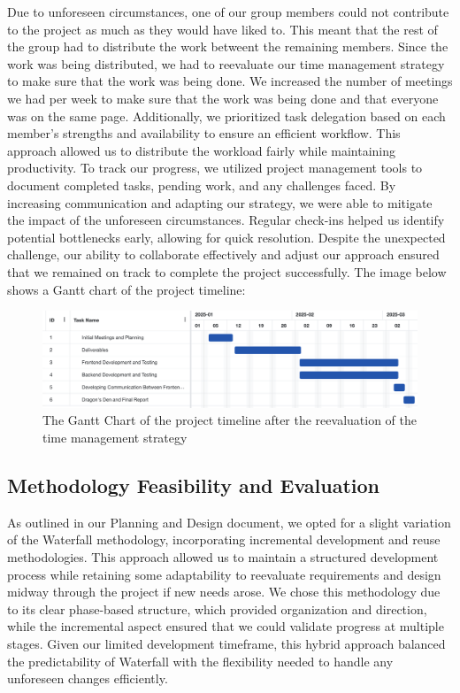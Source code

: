\documentclass{article}
\begin{document}
    Due to unforeseen circumstances, one of our group members could not contribute to the project as much as they would have liked to. This meant that the rest of the group had to distribute 
    the work betweent the remaining members. Since the work was being distributed, we had to reevaluate our time management strategy to make sure that the work was being done. 
    We increased the number of meetings we had per week to make sure that the work was being done and that everyone was on the same page.  Additionally, we prioritized task delegation based on each member’s strengths 
    and availability to ensure an efficient workflow. This approach allowed us to distribute the workload fairly while maintaining productivity. To track our progress, we utilized project management tools to document 
    completed tasks, pending work, and any challenges faced. By increasing communication and adapting our strategy, we were able to mitigate the impact of the unforeseen circumstances. Regular check-ins helped us identify potential 
    bottlenecks early, allowing for quick resolution. Despite the unexpected challenge, our ability to collaborate effectively and adjust our approach ensured that we remained on track to complete the project successfully. The image 
    below shows a Gantt chart of the project timeline:

    \begin{figure}[H]
        \centering
        \includegraphics[width=\textwidth]{ganttChart}
        \caption{The Gantt Chart of the project timeline after the reevaluation of the time management strategy}
        \label{fig:ganttChart}
    \end{figure}

    \subsection{Methodology Feasibility and Evaluation}

    As outlined in our Planning and Design document, we opted for a slight variation of the Waterfall methodology, incorporating incremental development and reuse methodologies. This approach allowed us to maintain a structured 
    development process while retaining some adaptability to reevaluate requirements and design midway through the project if new needs arose. We chose this methodology due to its clear phase-based structure, which provided 
    organization and direction, while the incremental aspect ensured that we could validate progress at multiple stages. Given our limited development timeframe, this hybrid approach balanced the predictability of Waterfall 
    with the flexibility needed to handle any unforeseen changes efficiently.
\end{document}

